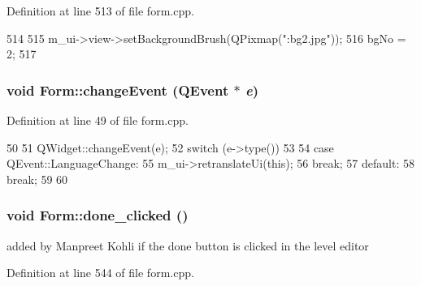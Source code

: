 Definition at line 513 of file form.cpp.


\begin{DoxyCode}
514 {
515     m_ui->view->setBackgroundBrush(QPixmap(":bg2.jpg"));
516     bgNo = 2;
517     }
\end{DoxyCode}
\hypertarget{class_form_a633009d9f1f6700717dccc3e11cb38d9}{
\subsubsection[{changeEvent}]{\setlength{\rightskip}{0pt plus 5cm}void Form::changeEvent (QEvent $\ast$ {\em e})}}
\label{class_form_a633009d9f1f6700717dccc3e11cb38d9}


Definition at line 49 of file form.cpp.


\begin{DoxyCode}
50 {
51     QWidget::changeEvent(e);
52     switch (e->type())
53     {
54         case QEvent::LanguageChange:
55             m_ui->retranslateUi(this);
56             break;
57         default:
58             break;
59     }
60 }
\end{DoxyCode}
\hypertarget{class_form_abcca43186cdcf3a8f65576b1f7581eea}{
\subsubsection[{done\_\-clicked}]{\setlength{\rightskip}{0pt plus 5cm}void Form::done\_\-clicked ()}}
\label{class_form_abcca43186cdcf3a8f65576b1f7581eea}
added by Manpreet Kohli if the done button is clicked in the level editor 

Definition at line 544 of file form.cpp.


